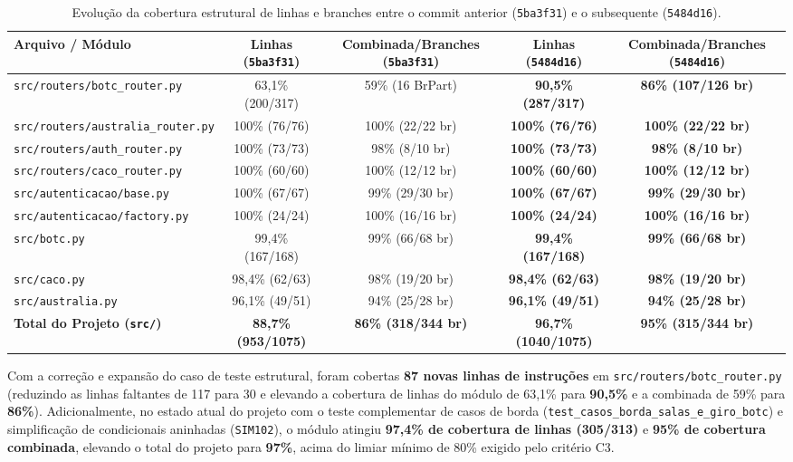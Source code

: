 \documentclass[12pt,a4paper]{article}
\begin{document}
\begin{table}[H]
\centering
\tiny
\begin{tabular}{|l|c|c|c|c|}
\hline
\rowcolor{gray!20} \textbf{Arquivo / Módulo} & \textbf{Linhas (\texttt{5ba3f31})} & \textbf{Combinada/Branches (\texttt{5ba3f31})} & \textbf{Linhas (\texttt{5484d16})} & \textbf{Combinada/Branches (\texttt{5484d16})} \\ \hline
\texttt{src/routers/botc\_router.py} & 63,1\% (200/317) & 59\% (16 BrPart) & \textbf{90,5\% (287/317)} & \textbf{86\% (107/126 br)} \\ \hline
\texttt{src/routers/australia\_router.py} & 100\% (76/76) & 100\% (22/22 br) & \textbf{100\% (76/76)} & \textbf{100\% (22/22 br)} \\ \hline
\texttt{src/routers/auth\_router.py} & 100\% (73/73) & 98\% (8/10 br) & \textbf{100\% (73/73)} & \textbf{98\% (8/10 br)} \\ \hline
\texttt{src/routers/caco\_router.py} & 100\% (60/60) & 100\% (12/12 br) & \textbf{100\% (60/60)} & \textbf{100\% (12/12 br)} \\ \hline
\texttt{src/autenticacao/base.py} & 100\% (67/67) & 99\% (29/30 br) & \textbf{100\% (67/67)} & \textbf{99\% (29/30 br)} \\ \hline
\texttt{src/autenticacao/factory.py} & 100\% (24/24) & 100\% (16/16 br) & \textbf{100\% (24/24)} & \textbf{100\% (16/16 br)} \\ \hline
\texttt{src/botc.py} & 99,4\% (167/168) & 99\% (66/68 br) & \textbf{99,4\% (167/168)} & \textbf{99\% (66/68 br)} \\ \hline
\texttt{src/caco.py} & 98,4\% (62/63) & 98\% (19/20 br) & \textbf{98,4\% (62/63)} & \textbf{98\% (19/20 br)} \\ \hline
\texttt{src/australia.py} & 96,1\% (49/51) & 94\% (25/28 br) & \textbf{96,1\% (49/51)} & \textbf{94\% (25/28 br)} \\ \hline
\rowcolor{green!10} \textbf{Total do Projeto (\texttt{src/})} & \textbf{88,7\% (953/1075)} & \textbf{86\% (318/344 br)} & \textbf{96,7\% (1040/1075)} & \textbf{95\% (315/344 br)} \\ \hline
\end{tabular}
\caption{Evolução da cobertura estrutural de linhas e branches entre o commit anterior (\texttt{5ba3f31}) e o subsequente (\texttt{5484d16}).}
\label{tab:cobertura_estrutural}
\end{table}

Com a correção e expansão do caso de teste estrutural, foram cobertas \textbf{87 novas linhas de instruções} em \texttt{src/routers/botc\_router.py} (reduzindo as linhas faltantes de 117 para 30 e elevando a cobertura de linhas do módulo de 63,1\% para \textbf{90,5\%} e a combinada de 59\% para \textbf{86\%}). Adicionalmente, no estado atual do projeto com o teste complementar de casos de borda (\texttt{test\_casos\_borda\_salas\_e\_giro\_botc}) e simplificação de condicionais aninhadas (\texttt{SIM102}), o módulo atingiu \textbf{97,4\% de cobertura de linhas (305/313)} e \textbf{95\% de cobertura combinada}, elevando o total do projeto para \textbf{97\%}, acima do limiar mínimo de 80\% exigido pelo critério C3.
\end{document}

